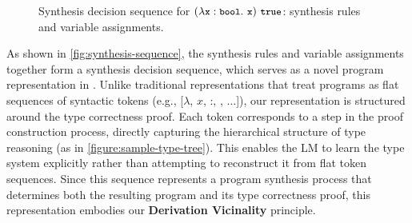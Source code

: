 \begin{figure}[tb]
\centering
{}

\setlength{\fboxsep}{1pt}
\caption{Synthesis decision sequence for $\app{(\abs{\tcode{x}}{\tcode{bool}}{\tcode{x}})}{\tcode{true}}$: 
\colorbox{gray!15}{\textsf{synthesis rules}} and 
\colorbox{blue!8}{\textsf{variable assignments}}.}
\label{fig:synthesis-sequence}
\end{figure}

As shown in \autoref{fig:synthesis-sequence}, the synthesis rules and variable assignments together form a synthesis decision sequence, which serves as a novel program representation in \mainname. 
Unlike traditional representations that treat programs as flat sequences of syntactic tokens (e.g., [$\lambda$, $x$, :, , $\dots$]), our representation is structured around the type correctness proof. Each token corresponds to a step in the proof construction process, directly capturing the hierarchical structure of type reasoning (as in \autoref{figure:sample-type-tree}). This enables the LM to learn the type system explicitly rather than attempting to reconstruct it from flat token sequences. Since this sequence represents a program synthesis process that determines both the resulting program and its type correctness proof, this representation embodies our \textbf{Derivation Vicinality} principle.

